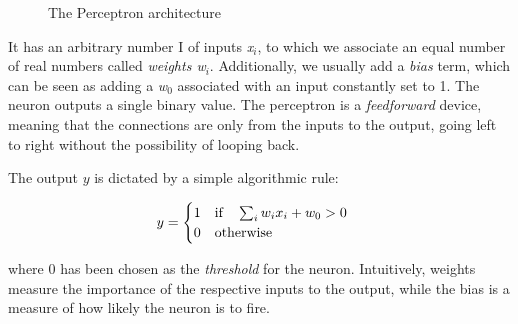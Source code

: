 \begin{figure}
    \centering
    
    
    \caption[The Perceptron]{The Perceptron architecture}
    \label{fig:rosper}
\end{figure}

It has an arbitrary number I of inputs \emph{x$_i$}, to which we associate an equal number of real numbers called \emph{weights w$_i$}. Additionally, we usually add a \emph{bias} term,  which can be seen as adding a \emph{w$_0$} associated with an input constantly set to 1. The neuron outputs a single binary value. The perceptron is a \emph{feedforward} device, meaning that the connections are only from the inputs to the output, going left to right without the possibility of looping back.

The output $y$ is dictated by a simple algorithmic rule:

\[
\centering
y = 
\begin{cases}
1 \quad \text{if} \quad \sum_i w_ix_i + w_0 > 0 \\
0 \quad \text{otherwise}
\end{cases}
\]

where $0$ has been chosen as the \emph{threshold} for the neuron. 
Intuitively, weights measure the importance of the respective inputs to the output, while the bias is a measure of how likely the neuron is to fire. 

